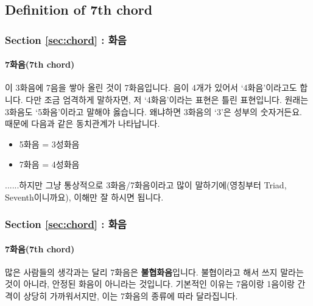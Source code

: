 \documentclass{beamer}
\begin{document}
	\subsection{Definition of 7th chord}
	\begin{frame}
		\frametitle{Section \ref{sec:chord} : 화음}
		\framesubtitle{7화음(7th chord)}
		이 3화음에 7음을 쌓아 올린 것이 7화음입니다. 음이 4개가 있어서 `4화음'이라고도 합니다. 다만 조금 엄격하게 말하자면, 저 `4화음'이라는 표현은 틀린 표현입니다. 원래는 3화음도 `5화음'이라고 말해야 옳습니다. 왜냐하면 3화음의 `3'은 성부의 숫자거든요. 때문에 다음과 같은 동치관계가 나타납니다.
		\begin{itemize}
			\item 5화음 = 3성화음
			\item 7화음 = 4성화음
		\end{itemize}
		......하지만 그냥 통상적으로 3화음/7화음이라고 많이 말하기에(영칭부터 Triad, Seventh이니까요), 이해만 잘 하시면 됩니다.
	\end{frame}
	
	\begin{frame}
		\frametitle{Section \ref{sec:chord} : 화음}
		\framesubtitle{7화음(7th chord)}
		많은 사람들의 생각과는 달리 7화음은 {\bf 불협화음}입니다. 불협이라고 해서 쓰지 말라는 것이 아니라, 안정된 화음이 아니라는 것입니다.
		기본적인 이유는 7음이랑 1음이랑 간격이 상당히 가까워서지만, 이는 7화음의 종류에 따라 달라집니다.
	\end{frame}
	
\end{document}
